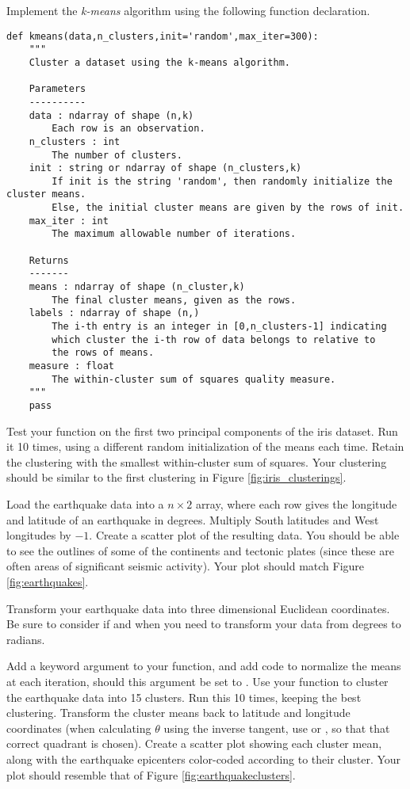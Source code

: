 
Implement the \emph{k-means} algorithm using the following function declaration.

\begin{lstlisting}
def kmeans(data,n_clusters,init='random',max_iter=300):
    """
    Cluster a dataset using the k-means algorithm.

    Parameters
    ----------
    data : ndarray of shape (n,k)
        Each row is an observation.
    n_clusters : int
        The number of clusters.
    init : string or ndarray of shape (n_clusters,k)
        If init is the string 'random', then randomly initialize the cluster means.
        Else, the initial cluster means are given by the rows of init.
    max_iter : int
        The maximum allowable number of iterations.

    Returns
    -------
    means : ndarray of shape (n_cluster,k)
        The final cluster means, given as the rows.
    labels : ndarray of shape (n,)
        The i-th entry is an integer in [0,n_clusters-1] indicating
        which cluster the i-th row of data belongs to relative to
        the rows of means.
    measure : float
        The within-cluster sum of squares quality measure.
    """
    pass
\end{lstlisting}

Test your function on the first two principal components of the iris dataset.
Run it 10 times, using a different random initialization of the means each time.
Retain the clustering with the smallest within-cluster sum of squares.
Your clustering should be similar to the first clustering in Figure \ref{fig:iris_clusterings}.

Load the earthquake data into a $n\times 2$ array, where each row gives the longitude and latitude of an earthquake in degrees.
Multiply South latitudes and West longitudes by $-1$.
Create a scatter plot of the resulting data. You should be able to see the outlines of some of the continents and tectonic plates (since these are often areas of significant seismic activity). Your plot should match Figure \ref{fig:earthquakes}.

Transform your earthquake data into three dimensional Euclidean coordinates.
Be sure to consider if and when you need to transform your data from degrees to radians.

Add a keyword argument  to your  function, and add code to normalize the means at each iteration, should this argument be set to .
Use your function to cluster the earthquake data into 15 clusters. Run this 10 times, keeping the best clustering.
Transform the cluster means back to latitude and longitude coordinates (when calculating $\theta$ using the inverse tangent, use  or ,
so that that correct quadrant is chosen).
Create a scatter plot showing each cluster mean, along with the earthquake epicenters color-coded according to their cluster. Your plot should resemble that of Figure \ref{fig:earthquakeclusters}.

